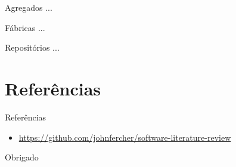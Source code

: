 \documentclass[aspectratio=169]{beamer}
\begin{document}
\begin{frame}{Agregados}	
	...
\end{frame}

\begin{frame}{Fábricas}	
	...
\end{frame}

\begin{frame}{Repositórios}	
	...
\end{frame}

\section{Referências}
\begin{frame}{Referências}	
	\begin{itemize}	
		\item \href{https://github.com/johnfercher/software-literature-review}{https://github.com/johnfercher/software-literature-review}
	\end{itemize}
\end{frame}

\begin{frame}[standout]
  	Obrigado		
\end{frame}
\end{document}
